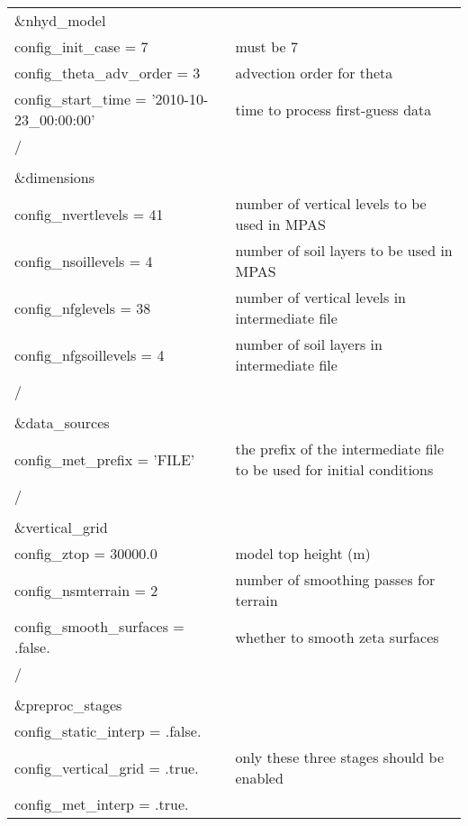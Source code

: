 \begin{longtable}{p{3.0in} |p{3.25in}}

\&nhyd\_model\\
   config\_init\_case       = 7                      & must be 7 \\
   config\_theta\_adv\_order = 3                     & advection order for theta \\
   config\_start\_time      = '2010-10-23\_00:00:00' & time to process first-guess data \\
/\\
\\
\&dimensions\\
   config\_nvertlevels     = 41                      & number of vertical levels to be used in MPAS \\
   config\_nsoillevels     = 4                       & number of soil layers to be used in MPAS \\
   config\_nfglevels       = 38                      & number of vertical levels in intermediate file \\
   config\_nfgsoillevels   = 4                       & number of soil layers in intermediate file \\
/\\
\\
\&data\_sources\\
   config\_met\_prefix      = 'FILE'                 & the prefix of the intermediate file to be used for initial conditions \\
/\\
\\
\&vertical\_grid\\
   config\_ztop            = 30000.0                 & model top height (m) \\
   config\_nsmterrain      = 2                       & number of smoothing passes for terrain \\
   config\_smooth\_surfaces = .false.                 & whether to smooth zeta surfaces \\
/\\
\\
\&preproc\_stages                                    & \\
   config\_static\_interp   = .false.                & \\
   config\_vertical\_grid   = .true.                 & only these three stages should be enabled \\
   config\_met\_interp      = .true.                 & \\

\end{longtable}
